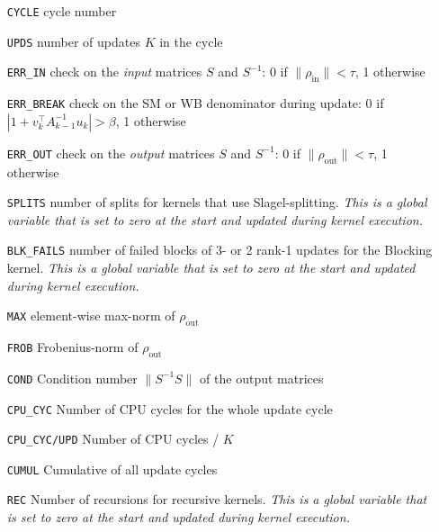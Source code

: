 \documentclass[11pt]{article}
\numberwithin{figure}{section}
\numberwithin{table}{section}
\begin{document}
    	\begin{itemize}
    		\item [\texttt{CYCLE}] cycle number
    		\item [\texttt{UPDS}] number of updates $K$ in the cycle
    		\item [\texttt{ERR\_IN}] check on the \emph{input} matrices $S$ and $S^{-1}$: 0 if $\|\rho_\mathrm{in}\|<\tau$, 1 otherwise
    		\item [\texttt{ERR\_BREAK}] check on the SM or WB denominator during  update: 0 if $\left|1+v_k^\top A_{k-1}^{-1}u_k\right| > \beta$, 1 otherwise
    		\item [\texttt{ERR\_OUT}] check on the \emph{output} matrices $S$ and $S^{-1}$: 0 if $\|\rho_\mathrm{out}\|<\tau$, 1 otherwise
    		\item [\texttt{SPLITS}] number of splits for kernels that use Slagel-splitting. \emph{This is a global variable that is set to zero at the start and updated during kernel execution.}
    		\item [\texttt{BLK\_FAILS}] number of failed blocks of 3- or 2 rank-1 updates for the Blocking kernel. \emph{This is a global variable that is set to zero at the start and updated during kernel execution.}
    		\item [\texttt{MAX}] element-wise max-norm of $\rho_\mathrm{out}$ 
    		\item [\texttt{FROB}] Frobenius-norm of $\rho_\mathrm{out}$ 
    		\item [\texttt{COND}] Condition number $\|S^{-1}S\|$ of the output matrices
    		\item [\texttt{CPU\_CYC}] Number of CPU cycles for the whole update cycle
    		\item [\texttt{CPU\_CYC/UPD}] Number of CPU cycles /  $K$
    		\item [\texttt{CUMUL}] Cumulative of all update cycles
    		\item [\texttt{REC}] Number of recursions for recursive kernels. \emph{This is a global variable that is set to zero at the start and updated during kernel execution.}
    	\end{itemize}
			
\end{document}
